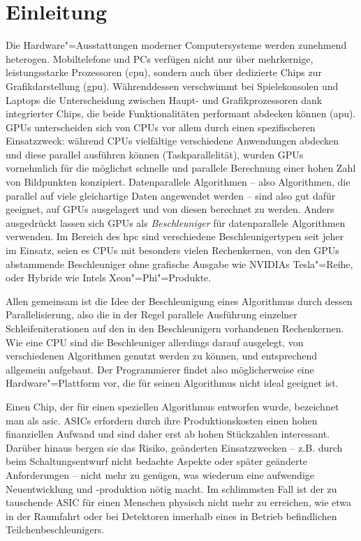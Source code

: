 \chapter{Einleitung}\label{einleitung}

Die Hardware"=Ausstattungen moderner Computersysteme werden zunehmend heterogen.
Mobiltelefone und PCs verfügen nicht nur über mehrkernige, leistungsstarke
Prozessoren (\gls{cpu}), sondern auch über dedizierte Chips zur
Grafikdarstellung (\gls{gpu}). Währenddessen verschwimmt bei Spielekonsolen und
Laptops die Unterscheidung zwischen Haupt- und Grafikprozessoren dank
integrierter Chips, die beide Funktionalitäten performant abdecken können
(\gls{apu}). GPUs unterscheiden sich von CPUs vor allem durch einen
spezifischeren Einsatzzweck: während CPUs vielfältige verschiedene
Anwendungen abdecken und diese parallel ausführen können (Taskparallelität),
wurden GPUs vornehmlich für die möglichst schnelle und parallele Berechnung
einer hohen Zahl von Bildpunkten konzipiert. Datenparallele Algorithmen -- also
Algorithmen, die parallel auf viele gleichartige Daten angewendet werden -- sind
also gut dafür geeignet, auf GPUs ausgelagert und von diesen berechnet zu
werden. Anders ausgedrückt lassen sich GPUs als \textit{Beschleuniger} für
datenparallele Algorithmen verwenden. Im Bereich des \gls{hpc} sind verschiedene
Beschleunigertypen seit jeher im Einsatz, seien es CPUs mit besonders vielen
Rechenkernen, von den GPUs abstammende Beschleuniger ohne grafische Ausgabe wie
NVIDIAs Tesla"=Reihe, oder Hybride wie Intels Xeon"=Phi"=Produkte.

Allen gemeinsam ist die Idee der Beschleunigung eines Algorithmus durch dessen
Parallelisierung, also die in der Regel parallele Ausführung einzelner
Schleifeniterationen auf den in den Beschleunigern vorhandenen Rechenkernen.
Wie eine CPU sind die Beschleuniger allerdings darauf ausgelegt, von
verschiedenen Algorithmen genutzt werden zu können, und entsprechend allgemein
aufgebaut. Der Programmierer findet also möglicherweise eine Hardware"=Plattform
vor, die für seinen Algorithmus nicht ideal geeignet ist.

Einen Chip, der für einen speziellen Algorithmus entworfen wurde, bezeichnet man
als \gls{asic}. ASICs erfordern durch ihre Produktionskosten einen hohen
finanziellen Aufwand und sind daher erst ab hohen Stückzahlen interessant.
Darüber hinaus bergen sie das Risiko, geänderten Einsatzzwecken -- z.B. durch
beim Schaltungsentwurf nicht bedachte Aspekte oder später geänderte
Anforderungen -- nicht mehr zu genügen, was wiederum eine aufwendige
Neuentwicklung und -produktion nötig macht. Im schlimmsten Fall ist der zu
tauschende ASIC für einen Menschen physisch nicht mehr zu erreichen, wie etwa in
der Raumfahrt oder bei Detektoren innerhalb eines in Betrieb befindlichen
Teilchenbeschleunigers.

